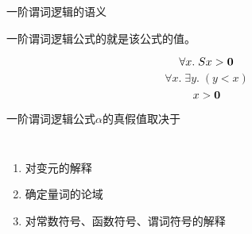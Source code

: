 
\begin{frame}{}
  \begin{center}
    一阶谓词逻辑的语义
  \end{center}
\end{frame}

\begin{frame}{}
  \begin{center}
    一阶谓词逻辑公式的就是该公式的值。

    \[
      \forall x.\; Sx > {\bf 0}
    \]
    \pause
    \[
      \forall x.\; \exists y.\; (y < x)
    \]
    \pause
    \[
      x > {\bf 0}
    \]

    \pause
    \vspace{0.60cm}
    一阶谓词逻辑公式$\alpha$的真假值取决于
    \begin{columns}
        \begin{enumerate}[(1)]
          \setlength{\itemsep}{6pt}
          \item 对变元的解释
          \item 确定量词的论域
          \item 对常数符号、函数符号、谓词符号的解释
        \end{enumerate}
    \end{columns}

    \pause
    \vspace{0.60cm}
  \end{center}
\end{frame}

\begin{frame}{}
\end{frame}

\begin{frame}{}
\end{frame}

\begin{frame}{}
\end{frame}
